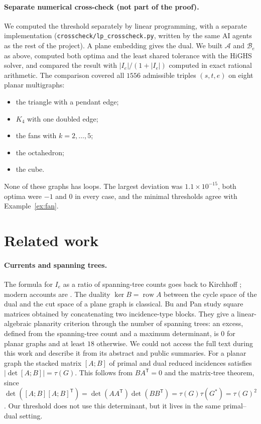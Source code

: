 \documentclass[11pt]{amsart}
\theoremstyle{plain}
\theoremstyle{definition}
\theoremstyle{remark}
\newcommand{\T}{\mathsf{T}}
\newcommand{\row}{\operatorname{row}}
\newcommand{\code}[1]{\texttt{#1}}
\begin{document}
\paragraph{Separate numerical cross-check (not part of the proof).} We computed the threshold separately by
linear programming, with a separate implementation (\code{crosscheck/lp\_crosscheck.py}, written by the same AI
agents as the rest of the project). A plane embedding gives the dual. We built $\mathcal A$ and $\mathcal B_e$ as above, computed
both optima and the least shared tolerance with the HiGHS solver, and compared the result with $|I_e|/(1+|I_e|)$
computed in exact rational arithmetic. The comparison covered all $1556$ admissible triples $(s,t,e)$ on eight
planar multigraphs:
\begin{itemize}
\item the triangle with a pendant edge;
\item $K_4$ with one doubled edge;
\item the fans with $k=2,\dots,5$;
\item the octahedron;
\item the cube.
\end{itemize}
None of these graphs has loops. The largest deviation was $1.1\times10^{-15}$, both optima were $-1$ and $0$ in every case, and the minimal
thresholds agree with Example~\ref{ex:fan}.

\section{Related work}\label{sec:related}

\paragraph{Currents and spanning trees.} The formula for $I_e$ as a ratio of spanning-tree counts goes back to
Kirchhoff \cite{Kirchhoff1847}; modern accounts are \cite{DoyleSnell,Bollobas,LyonsPeres}. The duality
$\ker B=\row A$ between the cycle space of the dual and the cut space of a plane graph is classical. Bu and Pan
\cite{BuPan} study square matrices obtained by concatenating two incidence-type blocks. They give a
linear-algebraic planarity criterion through the number of spanning trees: an excess, defined from the
spanning-tree count and a maximum determinant, is $0$ for planar graphs and at least $18$ otherwise. We could not
access the full text during this work and describe it from its abstract and public summaries. For a planar graph
the stacked matrix $[A;B]$ of primal and dual reduced incidences satisfies $|\det[A;B]|=\tau(G)$. This follows
from $BA^{\T}=0$ and the matrix-tree theorem, since $\det([A;B][A;B]^{\T})=\det(AA^{\T})\det(BB^{\T})=
\tau(G)\tau(G^\ast)=\tau(G)^2$. Our threshold does not use this determinant, but it lives in the same primal--dual
setting.
\end{document}
